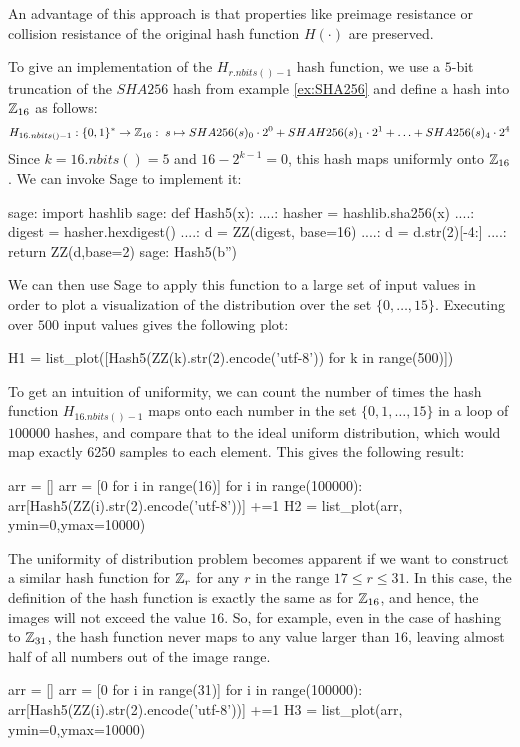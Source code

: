 An advantage of this approach is that properties like preimage resistance or collision resistance of the original hash function $H(\cdot)$ are preserved.
\begin{example} To give an implementation of the $H_{r.nbits()-1}$ hash function, we use a $5$-bit truncation of the $SHA256$ hash from example \ref{ex:SHA256} and define a hash into $\mathbb{Z}_{16}$ as follows:
$$
H_{16.nbits()-1}: \{0,1\}^* \to \mathbb{Z}_{16}:\; s\mapsto
SHA256(s)_0\cdot 2^0 + SHAH256(s)_1\cdot 2^1 + \ldots + SHA256(s)_4\cdot 2^4
$$
Since $k=16.nbits()=5$ and $16-2^{k-1}=0$, this hash maps uniformly onto $\mathbb{Z}_{16}$. We can invoke Sage to implement it:
\begin{sagecommandline}
sage: import hashlib
sage: def Hash5(x):
....:     hasher = hashlib.sha256(x)
....:     digest = hasher.hexdigest()
....:     d = ZZ(digest, base=16)
....:     d = d.str(2)[-4:]
....:     return ZZ(d,base=2)
sage: Hash5(b'')
\end{sagecommandline}
We can then use Sage to apply this function to a large set of input values in order to plot a visualization of the distribution over the set $\{0,\ldots,15\}$. Executing over $500$ input values gives the following plot:
\begin{sagesilent}
H1 = list_plot([Hash5(ZZ(k).str(2).encode('utf-8')) for k in range(500)])
\end{sagesilent}
\begin{center}
\end{center}
To get an intuition of uniformity, we can count the number of times the hash function $H_{16.nbits()-1}$ maps onto each number in the set $\{0,1,\ldots,15\}$ in a loop of $100000$ hashes, and compare that to the ideal uniform distribution, which would map exactly 6250 samples to each element. This gives the following result:
\begin{sagesilent}
arr = []
arr = [0 for i in range(16)]
for i in range(100000):
    arr[Hash5(ZZ(i).str(2).encode('utf-8'))] +=1
H2 = list_plot(arr, ymin=0,ymax=10000)
\end{sagesilent}
\begin{center}
\end{center}
The uniformity of distribution problem becomes apparent if we want to construct a similar hash function for $\mathbb{Z}_r$ for any $r$ in the range $17\leq r \leq 31$. In this case, the definition of the hash function is exactly the same as for $\mathbb{Z}_{16}$, and hence, the images will not exceed the value $16$. So, for example, even in the case of hashing to $\mathbb{Z}_{31}$, the hash function never maps to any value larger than $16$, leaving almost half of all numbers out of the image range.
\begin{sagesilent}
arr = []
arr = [0 for i in range(31)]
for i in range(100000):
    arr[Hash5(ZZ(i).str(2).encode('utf-8'))] +=1
H3 = list_plot(arr, ymin=0,ymax=10000)
\end{sagesilent}
\begin{center}
\end{center}
\end{example}

